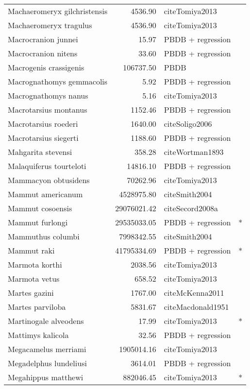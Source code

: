 \begin{table}[ht]
\begin{tabular}{lrll}
  Machaeromeryx gilchristensis & 4536.90 & cite{Tomiya2013} &  \\ 
  Machaeromeryx tragulus & 4536.90 & cite{Tomiya2013} &  \\ 
  Macrocranion junnei & 15.97 & PBDB + regression &  \\ 
  Macrocranion nitens & 33.60 & PBDB + regression &  \\ 
  Macrogenis crassigenis & 106737.50 & PBDB &  \\ 
  Macrognathomys gemmacolis & 5.92 & PBDB + regression &  \\ 
  Macrognathomys nanus & 5.16 & cite{Tomiya2013} &  \\ 
  Macrotarsius montanus & 1152.46 & PBDB + regression &  \\ 
  Macrotarsius roederi & 1640.00 & cite{Soligo2006} &  \\ 
  Macrotarsius siegerti & 1188.60 & PBDB + regression &  \\ 
  Mahgarita stevensi & 358.28 & cite{Wortman1893} &  \\ 
  Malaquiferus tourteloti & 14816.10 & PBDB + regression &  \\ 
  Mammacyon obtusidens & 70262.96 & cite{Tomiya2013} &  \\ 
  Mammut americanum & 4528975.80 & cite{Smith2004} &  \\ 
  Mammut cosoensis & 29076021.42 & cite{Secord2008a} &  \\ 
  Mammut furlongi & 29535033.05 & PBDB + regression & * \\ 
  Mammuthus columbi & 7998342.55 & cite{Smith2004} &  \\ 
  Mammut raki & 41795334.69 & PBDB + regression & * \\ 
  Marmota korthi & 2038.56 & cite{Tomiya2013} &  \\ 
  Marmota vetus & 658.52 & cite{Tomiya2013} &  \\ 
  Martes gazini & 1767.00 & cite{McKenna2011} &  \\ 
  Martes parviloba & 5831.67 & cite{Macdonald1951} &  \\ 
  Martinogale alveodens & 17.99 & cite{Tomiya2013} & * \\ 
  Mattimys kalicola & 32.56 & PBDB + regression &  \\ 
  Megacamelus merriami & 1905014.16 & cite{Tomiya2013} &  \\ 
  Megadelphus lundeliusi & 3614.01 & PBDB + regression &  \\ 
  Megahippus matthewi & 882046.45 & cite{Tomiya2013} & * \\ 

\end{tabular}
\end{table}
